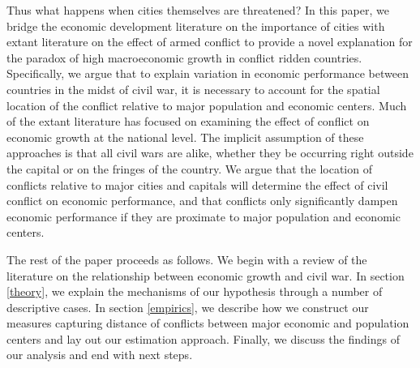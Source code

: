 Thus what happens when cities themselves are threatened? In this paper, we bridge the economic development literature on the importance of cities with extant literature on the effect of armed conflict to provide a novel explanation for the paradox of high macroeconomic growth in conflict ridden countries. Specifically,  we argue that to explain variation in economic performance between countries in the midst of civil war, it is necessary to account for the spatial location of the conflict relative to major population and economic centers. Much of the extant literature has focused on examining the effect of conflict on economic growth at the national level. The implicit assumption of these approaches is that all civil wars are alike, whether they be occurring right outside the capital or on the fringes of the country. We argue that the location of conflicts relative to major cities and capitals will determine the effect of civil conflict on economic performance, and that conflicts only significantly dampen economic performance if they are proximate to major population and economic centers. 

The rest of the paper proceeds as follows.  We begin with a review of the literature on the relationship between economic growth and civil war. In section \ref{theory}, we explain the mechanisms of our hypothesis through a number of descriptive cases. In section \ref{empirics}, we describe how we construct our measures capturing distance of conflicts between major economic and population centers and lay out our estimation approach. Finally, we discuss the findings of our analysis and end with next steps. 